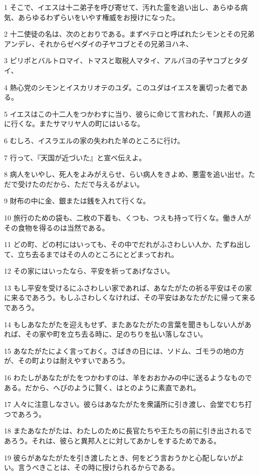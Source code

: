 \par 1 そこで、イエスは十二弟子を呼び寄せて、汚れた霊を追い出し、あらゆる病気、あらゆるわずらいをいやす権威をお授けになった。
\par 2 十二使徒の名は、次のとおりである。まずペテロと呼ばれたシモンとその兄弟アンデレ、それからゼベダイの子ヤコブとその兄弟ヨハネ、
\par 3 ピリポとバルトロマイ、トマスと取税人マタイ、アルパヨの子ヤコブとタダイ、
\par 4 熱心党のシモンとイスカリオテのユダ。このユダはイエスを裏切った者である。
\par 5 イエスはこの十二人をつかわすに当り、彼らに命じて言われた、「異邦人の道に行くな。またサマリヤ人の町にはいるな。
\par 6 むしろ、イスラエルの家の失われた羊のところに行け。
\par 7 行って、『天国が近づいた』と宣べ伝えよ。
\par 8 病人をいやし、死人をよみがえらせ、らい病人をきよめ、悪霊を追い出せ。ただで受けたのだから、ただで与えるがよい。
\par 9 財布の中に金、銀または銭を入れて行くな。
\par 10 旅行のための袋も、二枚の下着も、くつも、つえも持って行くな。働き人がその食物を得るのは当然である。
\par 11 どの町、どの村にはいっても、その中でだれがふさわしい人か、たずね出して、立ち去るまではその人のところにとどまっておれ。
\par 12 その家にはいったなら、平安を祈ってあげなさい。
\par 13 もし平安を受けるにふさわしい家であれば、あなたがたの祈る平安はその家に来るであろう。もしふさわしくなければ、その平安はあなたがたに帰って来るであろう。
\par 14 もしあなたがたを迎えもせず、またあなたがたの言葉を聞きもしない人があれば、その家や町を立ち去る時に、足のちりを払い落しなさい。
\par 15 あなたがたによく言っておく。さばきの日には、ソドム、ゴモラの地の方が、その町よりは耐えやすいであろう。
\par 16 わたしがあなたがたをつかわすのは、羊をおおかみの中に送るようなものである。だから、へびのように賢く、はとのように素直であれ。
\par 17 人々に注意しなさい。彼らはあなたがたを衆議所に引き渡し、会堂でむち打つであろう。
\par 18 またあなたがたは、わたしのために長官たちや王たちの前に引き出されるであろう。それは、彼らと異邦人とに対してあかしをするためである。
\par 19 彼らがあなたがたを引き渡したとき、何をどう言おうかと心配しないがよい。言うべきことは、その時に授けられるからである。
